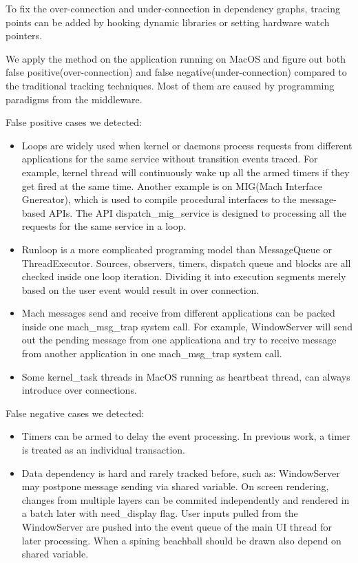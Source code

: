 To fix the over-connection and under-connection in dependency graphs, tracing points can be added by hooking dynamic libraries or setting hardware watch pointers.
\par
We apply the method on the application running on MacOS and figure out both false positive(over-connection) and false negative(under-connection) compared to the traditional tracking techniques. Most of them are caused by programming paradigms from the middleware.
\par \noindent
False positive cases we detected:
\begin{itemize}
\item Loops are widely used when kernel or daemons process requests from different applications for the same service without transition events traced.
For example, kernel thread will continuously wake up all the armed timers if they get fired at the same time.
Another example is on MIG(Mach Interface Gnereator), which is used to compile procedural interfaces to the message-based APIs.
The API dispatch\_mig\_service is designed to processing all the requests for the same service in a loop.
\item Runloop is a more complicated programing model than MessageQueue or ThreadExecutor.
Sources, observers, timers, dispatch queue and blocks are all checked inside one loop iteration.
Dividing it into execution segments merely based on the user event would result in over connection.
\item Mach messages send and receive from different applications can be packed inside one mach\_msg\_trap system call.
For example, WindowServer will send out the pending message from one applicationa and try to receive message from another application in one mach\_msg\_trap system call.
\item Some kernel\_task threads in MacOS running as heartbeat thread, can always introduce over connections.
\end{itemize}
False negative cases we detected:
\begin{itemize}
\item Timers can be armed to delay the event processing.
In previous work, a timer is treated as an individual transaction.
\item Data dependency is hard and rarely tracked before, such as:
\subitem WindowServer may postpone message sending via shared variable.
\subitem On screen rendering, changes from multiple layers can be commited independently and rendered in a batch later with need\_display flag.
\subitem User inputs pulled from the WindowServer are pushed into the event queue of the main UI thread for later processing.
\subitem When a spining beachball should be drawn also depend on shared variable.
\end{itemize}
\par
